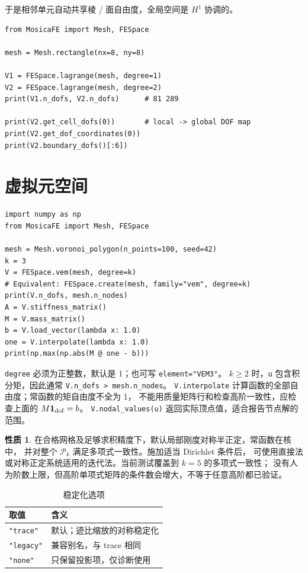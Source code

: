 \documentclass[UTF8,11pt,oneside]{ctexbook}
\theoremstyle{definition}
\newtheorem{property}{性质}[chapter]
\theoremstyle{plain}
\newcommand{\code}[1]{\texttt{#1}}
\begin{document}
于是相邻单元自动共享棱 / 面自由度，全局空间是 $H^1$ 协调的。

\begin{lstlisting}[language=MosicaFE,caption={示例 5.1：创建空间并查看自由度}]
from MosicaFE import Mesh, FESpace

mesh = Mesh.rectangle(nx=8, ny=8)

V1 = FESpace.lagrange(mesh, degree=1)
V2 = FESpace.lagrange(mesh, degree=2)
print(V1.n_dofs, V2.n_dofs)      # 81 289

print(V2.get_cell_dofs(0))       # local -> global DOF map
print(V2.get_dof_coordinates(0))
print(V2.boundary_dofs()[:6])
\end{lstlisting}

\section{虚拟元空间}

\begin{lstlisting}[language=MosicaFE,caption={任意阶 VEM 空间及常函数检查}]
import numpy as np
from MosicaFE import Mesh, FESpace

mesh = Mesh.voronoi_polygon(n_points=100, seed=42)
k = 3
V = FESpace.vem(mesh, degree=k)
# Equivalent: FESpace.create(mesh, family="vem", degree=k)
print(V.n_dofs, mesh.n_nodes)
A = V.stiffness_matrix()
M = V.mass_matrix()
b = V.load_vector(lambda x: 1.0)
one = V.interpolate(lambda x: 1.0)
print(np.max(np.abs(M @ one - b)))
\end{lstlisting}

\code{degree} 必须为正整数，默认是 1；也可写 \code{element="VEM3"}。
$k\ge2$ 时，\code{u} 包含积分矩，因此通常 \code{V.n\_\allowbreak dofs > mesh.n\_\allowbreak nodes}。
\code{V.interpolate} 计算函数的全部自由度；常函数的矩自由度不全为 1，
不能用质量矩阵行和检查高阶一致性，应检查上面的 $M\mathbf 1_{\rm dof}=b$。
\code{V.nodal\_\allowbreak values(u)} 返回实际顶点值，适合报告节点解的范围。

\begin{property}
在合格网格及足够求积精度下，默认局部刚度对称半正定，常函数在核中，
并对整个 $\mathcal P_k$ 满足多项式一致性。施加适当 Dirichlet 条件后，
可使用直接法或对称正定系统适用的迭代法。当前测试覆盖到 $k=5$ 的多项式一致性；
没有人为阶数上限，但高阶单项式矩阵的条件数会增大，不等于任意高阶都已验证。
\end{property}

\begin{table}[htbp]
\centering
\caption{稳定化选项}
\label{tab:stab}
\begin{lrbox}{\guideTableBox}
\begin{tabular}{@{}lp{9cm}@{}}
\toprule
取值 & 含义 \\
\midrule
\code{"trace"} & 默认；迹比缩放的对称稳定化 \\
\code{"legacy"} & 兼容别名，与 trace 相同 \\
\code{"none"} & 只保留投影项，仅诊断使用 \\
\bottomrule
\end{tabular}
\end{lrbox}%
\ifdim\wd\guideTableBox>\linewidth
  \resizebox{\linewidth}{!}{\usebox{\guideTableBox}}%
\else\usebox{\guideTableBox}\fi
\end{table}
\end{document}
